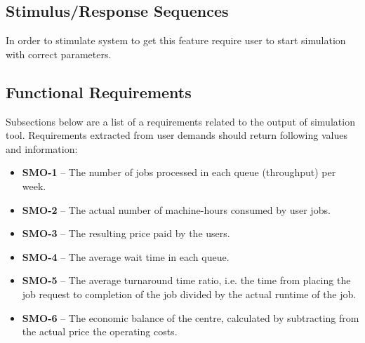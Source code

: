 \documentclass{report}
\begin{document}
\subsection{Stimulus/Response Sequences}
In order to stimulate system to get this feature require user to start simulation with correct parameters.
\subsection{Functional Requirements}

Subsections below are a list of a requirements related to the output of simulation tool.
Requirements extracted from user demands should return following values and information:
\begin{itemize}
	\item
	{
		\textbf{SMO-1} -- The number of jobs processed in each queue (throughput) per week.
	}
	\item
	{
		\textbf{SMO-2} -- The actual number of machine-hours consumed by user jobs.
	}
	\item
	{
		\textbf{SMO-3} -- The resulting price paid by the users.
	}
	\item
	{
		\textbf{SMO-4} -- The average wait time in each queue.
	}
	\item
	{
		\textbf{SMO-5} -- The average turnaround time ratio, i.e. the time from placing the job request to completion of the job divided by the actual runtime of the job.
	}
	\item
	{
		\textbf{SMO-6} -- The economic balance of the centre, calculated by subtracting from the actual price the operating costs.
	}

\end{itemize}
\end{document}
